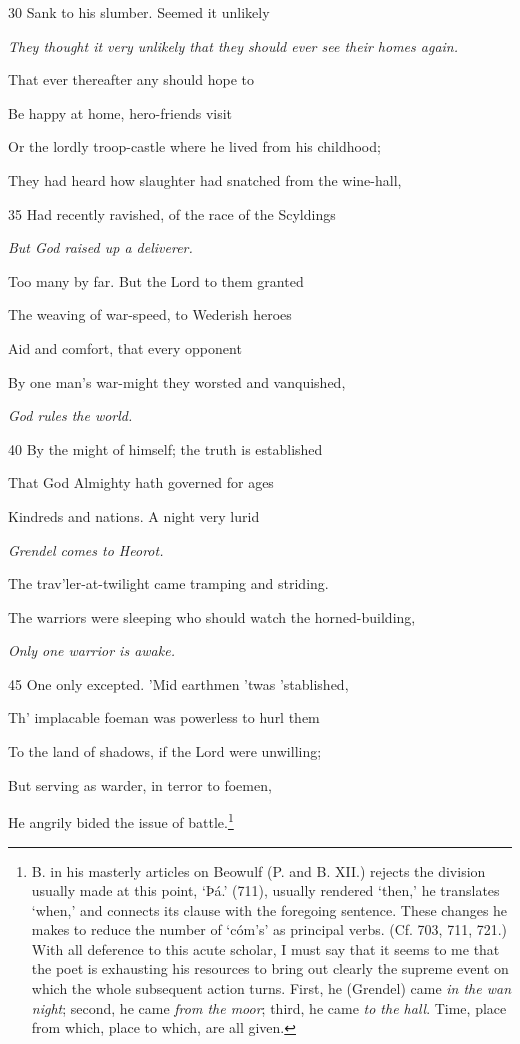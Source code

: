 30
Sank to his slumber. Seemed it unlikely

\emph{They thought it
very unlikely that
they should ever
see their homes
again.}

That ever thereafter any should hope to

Be happy at home, hero-friends visit

Or the lordly troop-castle where he lived from his childhood;

They had heard how slaughter had snatched from the wine-hall,

35
Had recently ravished, of the race of the Scyldings

\emph{But God raised up
a deliverer.}

Too many by far. But the Lord to them granted

The weaving of war-speed, to Wederish heroes

Aid and comfort, that every opponent

By one man’s war-might they worsted and vanquished,

\emph{God rules the
world.}

40
By the might of himself; the truth is established

That God Almighty hath governed for ages

Kindreds and nations. A night very lurid

\emph{Grendel comes to
Heorot.}

The trav’ler-at-twilight came tramping and striding.

The warriors were sleeping who should watch the horned-building,

\emph{Only one warrior
is awake.}

45
One only excepted. ’Mid earthmen ’twas ’stablished,

Th’ implacable foeman was powerless to hurl them

To the land of shadows, if the Lord were unwilling;

But serving as warder, in terror to foemen,

He angrily bided the issue of battle.\footnote{B. in his masterly articles on Beowulf (P. and B. XII.) rejects the division
usually made at this point, ‘Þá.’ (711), usually rendered ‘then,’ he translates
‘when,’ and connects its clause with the foregoing sentence. These changes
he makes to reduce the number of ‘cóm’s’ as principal verbs. (Cf. 703, 711,
721.) With all deference to this acute scholar, I must say that it seems to me
that the poet is exhausting his resources to bring out clearly the supreme event
on which the whole subsequent action turns. First, he (Grendel) came \emph{in
the wan night}; second, he came \emph{from the moor}; third, he came \emph{to the hall}.
Time, place from which, place to which, are all given.}

